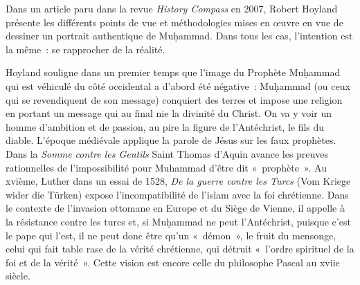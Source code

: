 Dans un article paru dans la revue \emph{History Compass} en 2007,
Robert Hoyland présente les différents points de vue et méthodologies
mises en œuvre en vue de dessiner un portrait authentique de
Muḥammad. Dans tous les cas, l'intention est la même~: se rapprocher
de la réalité.

Hoyland souligne dans un premier temps que l'image du Prophète Muḥammad
qui est véhiculé du côté occidental a d'abord été négative~: Muḥammad
(ou ceux qui se revendiquent de son message) conquiert des terres et
impose une religion en portant un message qui au final nie la divinité
du Christ. On va y voir un homme d'ambition et de passion, au pire la
figure de l'Antéchrist, le fils du diable. L'époque médiévale applique
la parole de Jésus sur les faux prophètes. Dans la \emph{Somme contre
les Gentils} Saint Thomas d'Aquin avance les preuves rationnelles de
l'impossibilité pour Muhammad d'être dit «~prophète~». Au xvième, Luther dans un essai de 1528,
\emph{De la guerre contre les Turcs} (Vom Kriege wider die Türken)
expose l'incompatibilité de l'islam avec la foi chrétienne. Dans le
contexte de l'invasion ottomane en Europe et du Siège de Vienne, il
appelle à la résistance contre les turcs et, si Muḥammad ne peut
l'Antéchrist, puisque c'est le pape qui l'est, il ne peut donc être
qu'un «~démon~», le fruit du mensonge, celui qui fait table rase de la
vérité chrétienne, qui détruit «~l'ordre spirituel de la foi et de la
vérité~». Cette vision est
encore celle du philosophe Pascal au xviie siècle.

